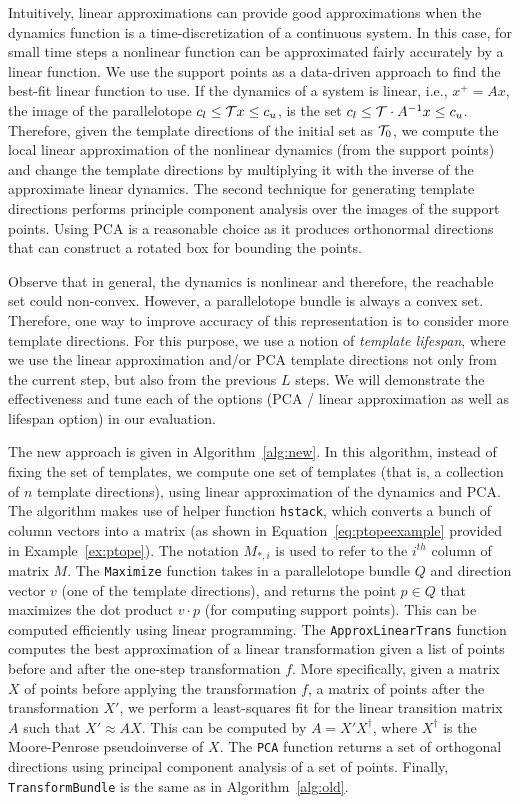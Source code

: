 Intuitively, linear approximations can provide good approximations when the dynamics function is a time-discretization of a continuous system.
%
In this case, for small time steps a nonlinear function can be approximated fairly accurately by a linear function.
%
We use the support points as a data-driven approach to find the best-fit linear function to use.
%
If the dynamics of a system is linear, i.e., $x^{+} = Ax$, the image of the parallelotope $c_{l} \leq {\cal T} x \leq c_{u}$, is the set $c_{l} \leq {\cal T} \cdot A^{-1} x \leq c_{u}$.
%
Therefore, given the template directions of the initial set as ${\cal T}_0$, we compute the local linear approximation of the nonlinear dynamics (from the support points) and change the template directions by multiplying it with the inverse of the approximate linear dynamics.
%
The second technique for generating template directions performs principle component analysis over the images of the support points.
%
Using PCA is a reasonable choice as it produces orthonormal directions that can construct a rotated box for bounding the points.
%

Observe that in general, the dynamics is nonlinear and therefore, the reachable set could non-convex.
%
However, a parallelotope bundle is always a convex set.
%
Therefore, one way to improve accuracy of this representation is to consider more template directions.
%
For this purpose, we use a notion of \emph{template lifespan}, where we use the linear approximation and/or PCA template directions not only from the current step, but also from the previous $L$ steps.
%
We will demonstrate the effectiveness and tune each of the options (PCA / linear approximation as well as lifespan option) in our evaluation.

The new approach is given in Algorithm~\ref{alg:new}.
%
In this algorithm, instead of fixing the set of templates, we compute one set of templates (that is, a collection of $n$ template directions), using linear approximation of the dynamics and PCA.
%
The algorithm makes use of helper function \texttt{hstack}, which converts a bunch of column vectors into a matrix (as shown in Equation~\ref{eq:ptopeexample} provided in Example~\ref{ex:ptope}).
%
The notation $M_{*,i}$ is used to refer to the $i^{th}$ column of matrix $M$.
%
The \texttt{Maximize} function takes in a parallelotope bundle $Q$ and direction vector $v$ (one of the template directions), and returns the point $p \in Q$ that maximizes the dot product $v \cdot p$ (for computing support points).
%
This can be computed efficiently using linear programming.
%
The \texttt{ApproxLinearTrans} function computes the best approximation of a linear transformation given a list of points before and after the one-step transformation $f$.
%
More specifically, given a matrix $X$ of points before applying the transformation $f$, a matrix of points after the transformation $X'$, we perform a least-squares fit for the linear transition matrix $A$ such that $X' \approx AX$.
%
This can be computed by $A = X' X^\dagger$, where $X^\dagger$ is the Moore-Penrose pseudoinverse of $X$.
%
The \texttt{PCA} function returns a set of orthogonal directions using principal component analysis of a set of points.
%
Finally, \texttt{TransformBundle} is the same as in Algorithm~\ref{alg:old}.

